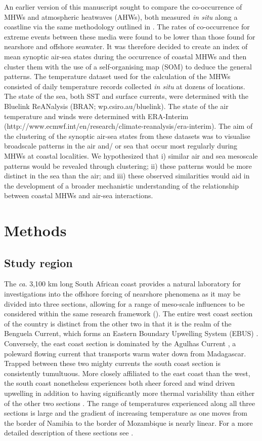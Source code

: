 \documentclass[a4paper,10pt,review]{elsarticle}
\begin{document}
An earlier version of this manuscript sought to compare the co-occurrence of MHWs and atmospheric heatwaves (AHWs), both measured \emph{in situ} along a coastline via the same methodology outlined in \citet{Schlegel2016}. The rates of co-occurrence for extreme events between these media were found to be lower than those found for nearshore and offshore seawater. It was therefore decided to create an index of mean synoptic air-sea states during the occurrence of coastal MHWs and then cluster them with the use of a self-organising map (SOM) to deduce the general patterns. The temperature dataset used for the calculation of the MHWs consisted of daily temperature records collected \emph{in situ} at dozens of locations. The state of the sea, both SST and surface currents, were determined with the Bluelink ReANalysis (BRAN; wp.csiro.au/bluelink). The state of the air temperature and winds were determined with ERA-Interim (http://www.ecmwf.int/en/research/climate-reanalysis/era-interim). The aim of the clustering of the synoptic air-sea states from these datasets was to visualise broadscale patterns in the air and/ or sea that occur most regularly during MHWs at coastal localities. We hypothesized that i) similar air and sea mesoscale patterns would be revealed through clustering; ii) these patterns would be more distinct in the sea than the air; and iii) these observed similarities would aid in the development of a broader mechanistic understanding of the relationship between coastal MHWs and air-sea interactions.

\section{Methods}
\subsection{Study region}
The \emph{ca}. 3,100 km long South African coast provides a natural laboratory for investigations into the offshore forcing of nearshore phenomena as it may be divided into three sections, allowing for a range of meso-scale influences to be considered within the same research framework (). The entire west coast section of the country is distinct from the other two in that it is the realm of the Benguela Current, which forms an Eastern Boundary Upwelling System (EBUS) \citep{Hutchings2009}. Conversely, the east coast section is dominated by the Agulhas Current \citep{Luning1990}, a poleward flowing current that transports warm water down from Madagascar. Trapped between these two mighty currents the south coast section is consistently tumultuous. More closely affiliated to the east coast than the west, the south coast nonetheless experiences both sheer forced and wind driven upwelling in addition to having significantly more thermal variability than either of the other two sections \citep{Schlegel2016}. The range of temperatures experienced along all three sections is large and the gradient of increasing temperature as one moves from the border of Namibia to the border of Mozambique is nearly linear. For a more detailed description of these sections see \citet{Smit2013}.
\end{document}
